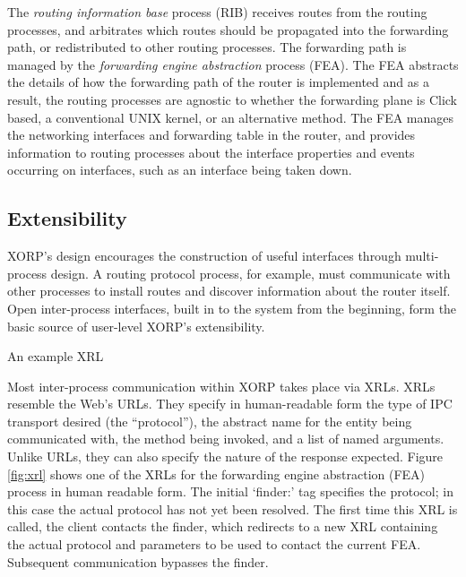 
The \emph{routing information base} process (RIB) receives routes from
the routing processes, and arbitrates which routes should be
propagated into the forwarding path, or redistributed to other routing
processes.  The forwarding path is managed
by the \emph{forwarding engine abstraction} process (FEA).  The FEA
abstracts the details of how the forwarding path of the router is
implemented and as a result, the routing processes are agnostic to
whether the forwarding plane is Click \cite{click} based, a conventional UNIX
kernel, or an alternative method.  The FEA manages the networking
interfaces and forwarding table in the router, and provides information to routing processes
about the interface properties and events occurring on interfaces, such as an
interface being taken down.


\subsection{Extensibility}

XORP's design encourages the construction of useful
interfaces through multi-process design.
A routing protocol process, for example, must communicate with other
processes to install routes and discover information about the router
itself.
Open inter-process interfaces, built in to the system from the beginning,
form the basic source of user-level XORP's extensibility.

%
\begin{floatingfigure}[r]{3.3in} %
\centerline{}
\caption{An example XRL}
\label{fig:xrl}
\vspace{-0.1in}
\end{floatingfigure}

\def\xrl#1{\textsf{\small #1}} Most inter-process communication within
XORP takes place via XRLs.  XRLs resemble the Web's URLs. They specify
in human-readable form the type of IPC transport desired (the
``protocol''), the abstract name for the entity being communicated
with, the method being invoked, and a list of named arguments.  Unlike
URLs, they can also specify the nature of the response expected.
Figure \ref{fig:xrl} shows one of the XRLs for
the forwarding engine abstraction (FEA) process in
human readable form. The initial `\xrl{finder:}' tag specifies the
protocol; in this case the actual protocol has not yet been resolved.
The first time this XRL is called, the client contacts the
finder, which redirects to a new XRL containing the
actual protocol and parameters to be used to
contact the current FEA.  Subsequent communication bypasses the finder.

